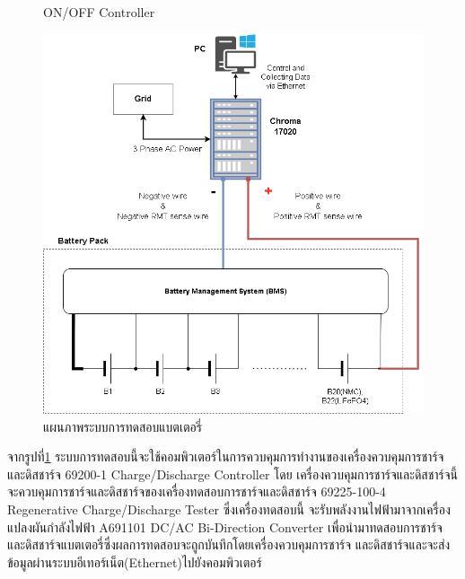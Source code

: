 \begin{center}
\begin{figure}[H]
			\caption{ON/OFF Controller}
	\end{figure}
\begin{figure}[!h]
	\includegraphics[width=1\linewidth]{Chapters/img/Testing_System.png}
		\centering
		\captionsetup{justification=centering,margin=2cm}
		\caption{แผนภาพระบบการทดสอบแบตเตอรี่}
		\label{fig:Testing_sys}
	\end{figure}
\end{center}
จากรูปที่\ref{fig:Testing_sys} ระบบการทดสอบนี้จะใช้คอมพิวเตอร์ในการควบคุมการทำงานของเครื่องควบคุมการชาร์จและดิสชาร์จ 69200-1 Charge/Discharge Controller โดย
เครื่องควบคุมการชาร์จและดิสชาร์จนี้จะควบคุมการชาร์จและดิสชาร์จของเครื่องทดสอบการชาร์จและดิสชาร์จ 69225-100-4 Regenerative Charge/Discharge Tester ซึ่งเครื่องทดสอบนี้
จะรับพลังงานไฟฟ้ามาจากเครื่องแปลงผันกำลังไฟฟ้า A691101 DC/AC Bi-Direction Converter เพื่อนำมาทดสอบการชาร์จและดิสชาร์จแบตเตอรี่ซึ่งผลการทดสอบจะถูกบันทึกโดยเครื่องควบคุมการชาร์จ
และดิสชาร์จและจะส่งข้อมูลผ่านระบบอีเทอร์เน็ต(Ethernet)ไปยังคอมพิวเตอร์
\vfill
